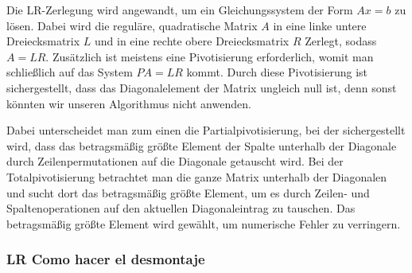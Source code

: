\documentclass[a4paper,11pt]{article}
\theoremstyle{definition}
\begin{document}
Die LR-Zerlegung wird angewandt, um ein Gleichungssystem der Form
$Ax=b$ zu lösen. Dabei wird die reguläre, quadratische Matrix $A$ in
eine linke untere Dreiecksmatrix $L$ und in eine rechte obere
Dreiecksmatrix $R$ Zerlegt, sodass $A=LR$. Zusätzlich ist meistens
eine Pivotisierung erforderlich, womit man schließlich auf das System
$PA=LR$ kommt. Durch diese Pivotisierung ist sichergestellt, dass das
Diagonalelement der Matrix ungleich null ist, denn sonst könnten wir
unseren Algorithmus nicht anwenden.

Dabei unterscheidet man zum einen die Partialpivotisierung, bei der
sichergestellt wird, dass das betragsmäßig größte Element der Spalte
unterhalb der Diagonale durch Zeilenpermutationen auf die Diagonale
getauscht wird. Bei der Totalpivotisierung betrachtet man die ganze
Matrix unterhalb der Diagonalen und sucht dort das betragsmäßig größte
Element, um es durch Zeilen- und Spaltenoperationen auf den aktuellen
Diagonaleintrag zu tauschen. Das betragsmäßig größte Element wird
gewählt, um numerische Fehler zu verringern.

\subsubsection{LR Como hacer el desmontaje}
\end{document}
